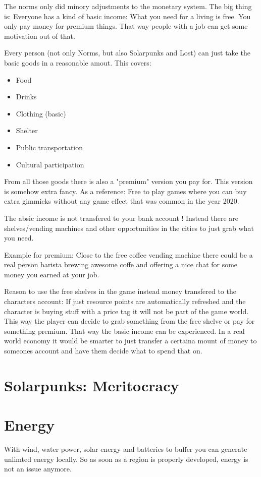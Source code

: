 The norms only did minory adjustments to the monetary system. The big thing is: Everyone has a kind of basic income: What you need for a living is free.
You only pay money for premium things. That way people with a job can get some motivation out of that.

Every person (not only Norms, but also Solarpunks and Lost) can just take the basic goods in a reasonable amout. This covers:

\begin{itemize}
    \item Food
    \item Drinks
    \item Clothing (basic)
    \item Shelter
    \item Public transportation
    \item Cultural participation
\end{itemize}

From all those goods there is also a "premium" version you pay for. This version is somehow extra fancy. As a reference: Free to play games where you can buy extra gimmicks without any game effect that was common in the year 2020.

The absic income is not transfered to your bank account ! Instead there are shelves/vending machines and other opportunities in the cities to just grab what you need.

Example for premium: Close to the free coffee vending machine there could be a real person barista brewing awesome coffe and offering a nice chat for some money you earned at your job.

\begin{reason}[]
    Reason to use the free shelves in the game instead money transfered to the characters account: If just resource points are automatically refreshed and the character is buying stuff with a price tag it will not be part of the game world. This way the player can decide to grab something from the free shelve or pay for something premium. That way the basic income can be experienced. In a real world economy it would be smarter to just transfer a certaina mount of money to someones account and have them decide what to spend that on.
\end{reason}

\section{Solarpunks: Meritocracy}



\section{Energy}

With wind, water power, solar energy and batteries to buffer you can generate unlimted energy locally. So as soon as a region is properly developed, energy is not an issue anymore.
